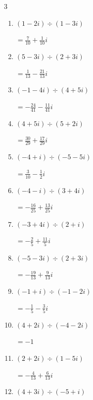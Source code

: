 \begin{multicols}{3}
\begin{enumerate}
        $\displaystyle =-\frac{26}{29}-\frac{7}{29}i$

  \item $\displaystyle (1-2i)\div(1-3i)$

        $\displaystyle =\frac{7}{10}+\frac{1}{10}i$

  \item $\displaystyle (5-3i)\div(2+3i)$

        $\displaystyle =\frac{1}{13}-\frac{21}{13}i$

  \item $\displaystyle (-1-4i)\div(4+5i)$

        $\displaystyle =-\frac{24}{41}-\frac{11}{41}i$

  \item $\displaystyle (4+5i)\div(5+2i)$

        $\displaystyle =\frac{30}{29}+\frac{17}{29}i$

  \item $\displaystyle (-4+i)\div(-5-5i)$

        $\displaystyle =\frac{3}{10}-\frac{1}{2}i$

  \item $\displaystyle (-4-i)\div(3+4i)$

        $\displaystyle =-\frac{16}{25}+\frac{13}{25}i$

\columnbreak %

\resetques

  \item $\displaystyle (-3+4i)\div(2+i)$

        $\displaystyle =-\frac{2}{5}+\frac{11}{5}i$

  \item $\displaystyle (-5-3i)\div(2+3i)$

        $\displaystyle =-\frac{19}{13}+\frac{9}{13}i$

  \item $\displaystyle (-1+i)\div(-1-2i)$

        $\displaystyle =-\frac{1}{5}-\frac{3}{5}i$

  \item $\displaystyle (4+2i)\div(-4-2i)$

        $\displaystyle =-1$

  \item $\displaystyle (2+2i)\div(1-5i)$

        $\displaystyle =-\frac{4}{13}+\frac{6}{13}i$

  \item $\displaystyle (4+3i)\div(-5+i)$


\end{enumerate}
\end{multicols}
